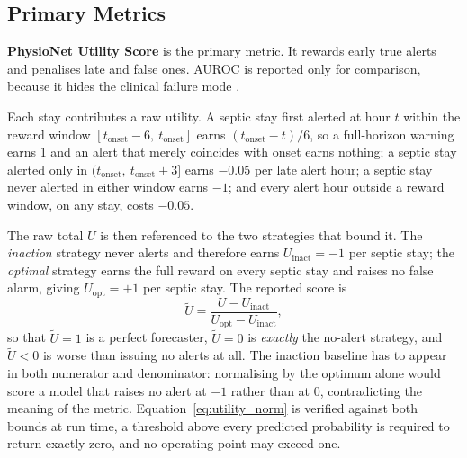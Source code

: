 \subsection{Primary Metrics}

\textbf{PhysioNet Utility Score} \cite{reyna2020utility} is the primary
metric. It rewards early true alerts and penalises late and false ones. AUROC
is reported only for comparison, because it hides the clinical failure mode
\cite{wang2025srpm}.

Each stay contributes a raw utility. A septic stay first alerted at hour $t$
within the reward window $[t_{\mathrm{onset}} - 6,\ t_{\mathrm{onset}}]$ earns
$(t_{\mathrm{onset}} - t)/6$, so a full-horizon warning earns 1 and an alert
that merely coincides with onset earns nothing; a septic stay alerted only in
$(t_{\mathrm{onset}},\ t_{\mathrm{onset}} + 3]$ earns $-0.05$ per late alert
hour; a septic stay never alerted in either window earns $-1$; and every alert
hour outside a reward window, on any stay, costs $-0.05$.

The raw total $U$ is then referenced to the two strategies that bound it. The
\emph{inaction} strategy never alerts and therefore earns $U_{\text{inact}} =
-1$ per septic stay; the \emph{optimal} strategy earns the full reward on every
septic stay and raises no false alarm, giving $U_{\text{opt}} = +1$ per septic
stay. The reported score is
\begin{equation}
    \widetilde{U} = \frac{U - U_{\text{inact}}}
                         {U_{\text{opt}} - U_{\text{inact}}},
    \label{eq:utility_norm}
\end{equation}
so that $\widetilde{U} = 1$ is a perfect forecaster, $\widetilde{U} = 0$ is
\emph{exactly} the no-alert strategy, and $\widetilde{U} < 0$ is worse than
issuing no alerts at all. The inaction baseline has to appear in both numerator
and denominator: normalising by the optimum alone would score a model that
raises no alert at $-1$ rather than at $0$, contradicting the meaning of the
metric. Equation~\eqref{eq:utility_norm} is verified against both bounds at run
time, a threshold above every predicted probability is required to return
exactly zero, and no operating point may exceed one.

